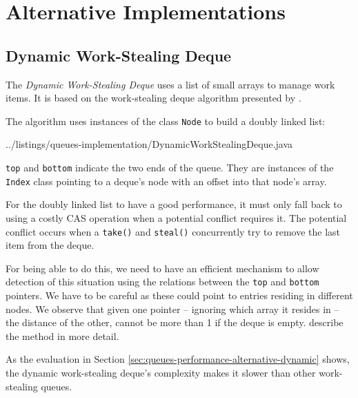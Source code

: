 


\section{Alternative Implementations}
\label{sec:queues-alternative-implementations}

\subsection{Dynamic Work-Stealing Deque}
\label{sec:queues-alternative-implementations-dynamic-deque}

The \emph{Dynamic Work-Stealing Deque} uses a list of small arrays to
manage work items. It is based on the work-stealing deque algorithm
presented by \textcite{Hendler2005}.

The algorithm uses instances of the class \lstinline!Node! to build a
doubly linked list:


{
    ../listings/queues-implementation/DynamicWorkStealingDeque.java
}

\lstinline!top! and \lstinline!bottom! indicate the two ends of the
queue. They are instances of the \lstinline!Index! class pointing to a
deque's node with an offset into that node's array.

For the doubly linked list to have a good performance, it must only
fall back to using a costly CAS operation when a potential conflict
requires it. The potential conflict occurs when a \lstinline!take()!
and \lstinline!steal()!  concurrently try to remove the last item from
the deque.

For being able to do this, we need to have an efficient mechanism to
allow detection of this situation using the relations between the
\lstinline!top! and \lstinline!bottom! pointers. We have to be careful
as these could point to entries residing in different nodes. We
observe that given one pointer -- ignoring which array it resides in
-- the distance of the other, cannot be more than 1 if the deque is
empty. \textcite{Hendler2005} describe the method in more detail.

As the evaluation in Section
\ref{sec:queues-performance-alternative-dynamic} shows, the dynamic
work-stealing deque's complexity makes it slower than other
work-stealing queues.


